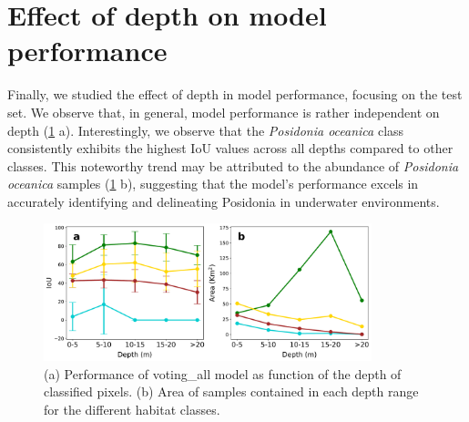 
\section{Effect of depth on model performance}\label{app:depth}

Finally, we studied the effect of depth in model performance, focusing on
the test set. We observe that, in general, model performance is rather
independent on depth (\cref{fig:IoU_class_depth} a). Interestingly, we observe
that the \textit{Posidonia oceanica} class consistently exhibits the highest
IoU values across all depths compared to other classes. This noteworthy trend
may be attributed to the abundance of \textit{Posidonia oceanica} samples
(\cref{fig:IoU_class_depth} b), suggesting that the model's performance excels
in accurately identifying and delineating Posidonia in underwater environments.

\begin{figure}[H]
    \centering
    \includegraphics[width=0.85\textwidth]{Figures/IoU_class_depth.pdf}
    \caption{(a) Performance of voting\_all model as function of the depth
        of classified pixels. (b) Area of samples contained in each depth range
        for the
        different habitat classes.}
    \label{fig:IoU_class_depth}
\end{figure}

